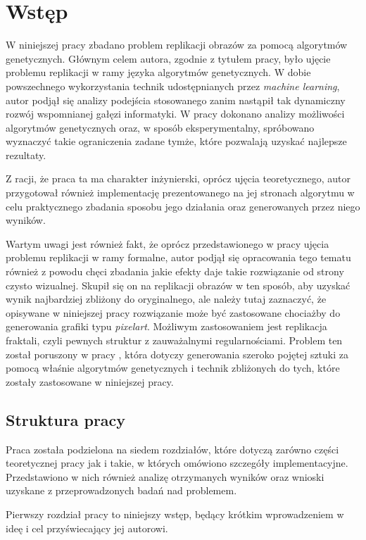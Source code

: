 \chapter{Wstęp}
\thispagestyle{chapterBeginStyle}
\label{wstep}

W niniejszej pracy zbadano problem replikacji obrazów za pomocą algorytmów genetycznych. Głównym celem autora, zgodnie z tytułem pracy, było ujęcie problemu replikacji w ramy języka algorytmów genetycznych. W dobie powszechnego wykorzystania technik udostępnianych przez \textit{machine learning}, autor podjął się analizy podejścia stosowanego zanim nastąpił tak dynamiczny rozwój wspomnianej gałęzi informatyki. W pracy dokonano analizy możliwości algorytmów genetycznych oraz, w sposób eksperymentalny, spróbowano wyznaczyć takie ograniczenia zadane tymże, które pozwalają uzyskać najlepsze rezultaty. 

Z racji, że praca ta ma charakter inżynierski, oprócz ujęcia teoretycznego, autor przygotował również implementację prezentowanego na jej stronach algorytmu w celu praktycznego zbadania sposobu jego działania oraz generowanych przez niego wyników. 

Wartym uwagi jest również fakt, że oprócz przedstawionego w pracy ujęcia problemu replikacji w ramy formalne, autor podjął się opracowania tego tematu również z powodu chęci zbadania jakie efekty daje takie rozwiązanie od strony czysto wizualnej. Skupił się on na replikacji obrazów w ten sposób, aby uzyskać wynik najbardziej zbliżony do oryginalnego, ale należy tutaj zaznaczyć, że opisywane w niniejszej pracy rozwiązanie może być zastosowane chociażby do generowania grafiki typu \textit{pixelart}. Możliwym zastosowaniem jest replikacja fraktali, czyli pewnych struktur z zauważalnymi regularnościami. Problem ten został poruszony w pracy \cite{ArtificialArt}, która dotyczy generowania szeroko pojętej sztuki za pomocą właśnie algorytmów genetycznych i technik zbliżonych do tych, które zostały zastosowane w niniejszej pracy.

\section{Struktura pracy}
Praca została podzielona na siedem rozdziałów, które dotyczą zarówno części teoretycznej pracy jak i takie, w których omówiono szczegóły implementacyjne. Przedstawiono w nich również analizę otrzymanych wyników oraz wnioski uzyskane z przeprowadzonych badań nad problemem.

Pierwszy rozdział pracy to niniejszy wstęp, będący krótkim wprowadzeniem w ideę i cel przyświecający jej autorowi.

